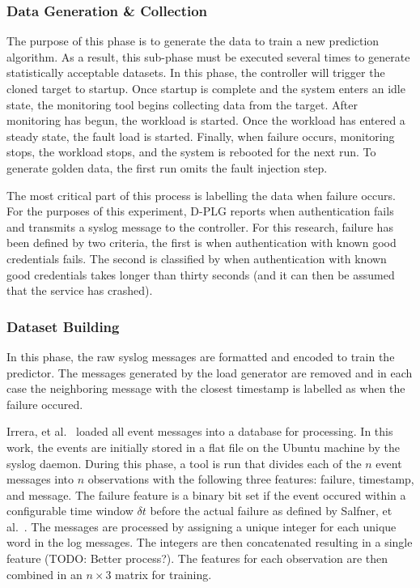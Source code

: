 \subsubsection{Data Generation \& Collection}
The purpose of this phase is to generate the data to train a new prediction
algorithm.  As a result, this sub-phase must be executed several times to
generate statistically acceptable datasets.  In this phase, the controller will
trigger the cloned target to startup.  Once startup is complete and the system
enters an idle state, the monitoring tool begins collecting data from the
target.  After monitoring has begun, the workload is started.  Once the
workload has entered a steady state, the fault load is started.  Finally, when
failure occurs, monitoring stops, the workload stops, and the system is
rebooted for the next run.  To generate golden data, the first run omits the
fault injection step.

The most critical part of this process is labelling the data when failure
occurs.  For the purposes of this experiment, D-PLG reports when authentication
fails and transmits a syslog message to the controller.  For this research,
failure has been defined by two criteria, the first is when authentication with
known good credentials fails.  The second is classified by when authentication
with known good credentials takes longer than thirty seconds (and it can then
be assumed that the service has crashed).

\subsubsection{Dataset Building}
In this phase, the raw syslog messages are formatted and encoded to train the
predictor.  The messages generated by the load generator are removed and in
each case the neighboring message with the closest timestamp is labelled as
when the failure occured.

Irrera, et al.~\cite{irrera2015} loaded all event messages into a database for
processing.  In this work, the events are initially stored in a flat file on
the Ubuntu machine by the syslog daemon.  During this phase, a tool is run that
divides each of the $n$ event messages into $n$ observations with the following
three features: failure, timestamp, and message.  The failure feature is a
binary bit set if the event occured within a configurable time window $\delta
t$ before the actual failure as defined by Salfner, et
al.~\cite{salfnerSurvey}.  The messages are processed by assigning a unique
integer for each unique word in the log messages.  The integers are then
concatenated resulting in a single feature (TODO: Better process?).  The
features for each observation are then combined in an $n \times 3$ matrix for
training.

